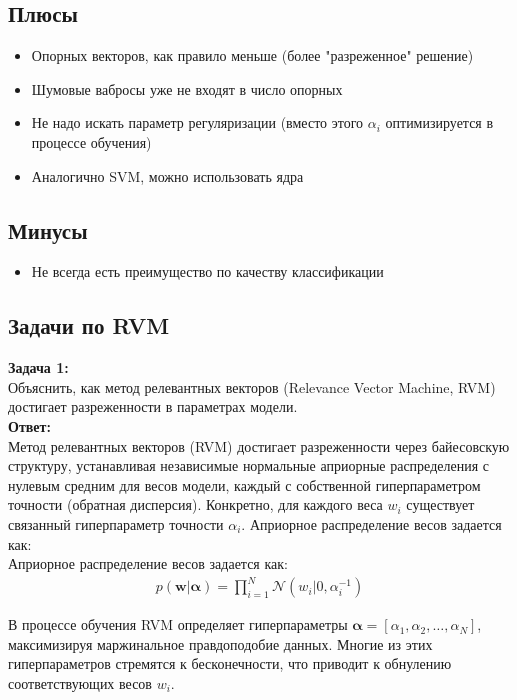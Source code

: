 \subsection*{Плюсы}
\begin{itemize}
    \item Опорных векторов, как правило меньше (более "разреженное" решение)
    \item Шумовые вабросы уже не входят в число опорных
    \item Не надо искать параметр регуляризации (вместо этого $\alpha_i$ оптимизируется в процессе обучения)
    \item Аналогично SVM, можно использовать ядра
\end{itemize}

\subsection*{Минусы}
\begin{itemize}
    \item Не всегда есть преимущество по качеству классификации
\end{itemize}

\subsection{Задачи по RVM}
\textbf{Задача 1:}\\
Объяснить, как метод релевантных векторов (Relevance Vector Machine, RVM) достигает разреженности в параметрах модели.  \\
\textbf{Ответ:}\\
Метод релевантных векторов (RVM) достигает разреженности через байесовскую структуру, устанавливая независимые нормальные априорные распределения с нулевым средним для весов модели, каждый с собственной гиперпараметром точности (обратная дисперсия). Конкретно, для каждого веса $w_i$ существует связанный гиперпараметр точности $\alpha_i$. 
Априорное распределение весов задается как:\\
Априорное распределение весов задается как:
\begin{align*}
       p(\mathbf{w} | \boldsymbol{\alpha}) = \prod_{i=1}^N \mathcal{N}(w_i | 0, \alpha_i^{-1})
\end{align*}

В процессе обучения RVM определяет гиперпараметры  $\boldsymbol{\alpha} = [\alpha_1, \alpha_2, \dots, \alpha_N]$, максимизируя маржинальное правдоподобие данных. Многие из этих гиперпараметров стремятся к бесконечности, что приводит к обнулению соответствующих весов $ w_i$. 

